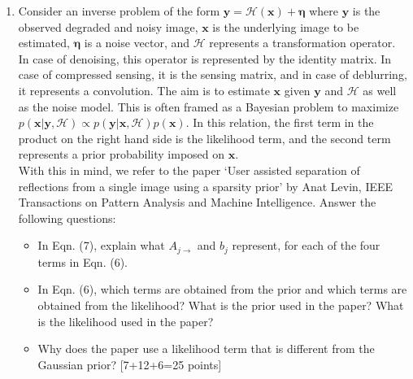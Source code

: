 \documentclass[11pt]{article}
\begin{document}
\begin{enumerate}

\item Consider an inverse problem of the form $\boldsymbol{y} = \mathcal{H}(\boldsymbol{x}) + \boldsymbol{\eta}$ where $\boldsymbol{y}$ is the observed degraded and noisy image, $\boldsymbol{x}$ is the underlying image to be estimated, $\boldsymbol{\eta}$ is a noise vector, and $\mathcal{H}$ represents a transformation operator. In case of denoising, this operator is represented by the identity matrix. In case of compressed sensing, it is the sensing matrix, and in case of deblurring, it represents a convolution. The aim is to estimate $\boldsymbol{x}$ given $\boldsymbol{y}$ and $\mathcal{H}$ as well as the noise model. This is often framed as a Bayesian problem to maximize
$p(\boldsymbol{x}|\boldsymbol{y},\mathcal{H}) \propto p(\boldsymbol{y}|\boldsymbol{x},\mathcal{H}) p(\boldsymbol{x})$. In this relation, the first term in the product on the right hand side is the likelihood term, and the second term represents a prior probability imposed on $\boldsymbol{x}$. 
\\
With this in mind, we refer to the paper `User assisted separation of reflections from a single image using a sparsity prior' by Anat Levin, IEEE Transactions on Pattern Analysis and Machine Intelligence. Answer the following questions: 
\begin{itemize}
\item In Eqn. (7), explain what $A_{j \rightarrow}$ and $b_j$ represent, for each of the four terms in Eqn. (6).
\item In Eqn. (6), which terms are obtained from the prior and which terms are obtained from the likelihood? What is the prior used in the paper? What is the likelihood used in the paper?
\item Why does the paper use a likelihood term that is different from the Gaussian prior? \textsf{[7+12+6=25 points]}
\end{itemize}


\end{enumerate}
\end{document}
